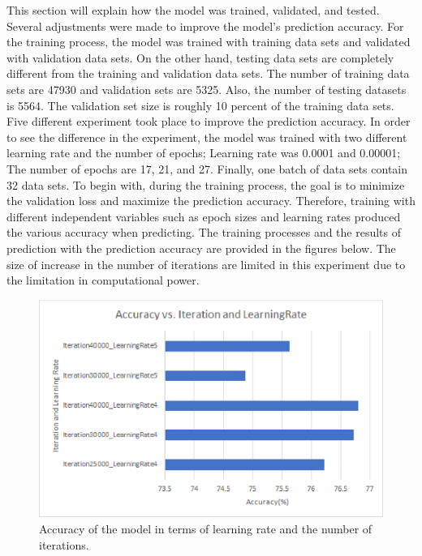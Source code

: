 This section will explain how the model was trained, validated, and tested. Several adjustments were
made to improve the model's prediction accuracy. For the training process, the model was trained with
training data sets and validated with validation data sets. On the other hand, testing data sets are
completely different from the training and validation data sets.
The number of training data sets are 47930 and validation sets are 5325. Also, the number of testing
datasets is 5564. The validation set size is
roughly 10 percent of the training data sets. Five different experiment took place to improve the
prediction accuracy. In order to see the difference in the experiment, the model was trained with two
different learning rate and the number of epochs; Learning rate was 0.0001 and 0.00001; The number of
epochs are 17, 21, and 27. Finally, one batch of data sets contain 32 data sets.
\newline
\newline
\indent
To begin with, during the training process, the goal is to minimize the validation loss and maximize the prediction accuracy. Therefore,
training with different independent variables such as epoch sizes and learning rates produced the various
accuracy when predicting. The training processes and the results of prediction with the prediction accuracy are
provided in the figures below. The size of increase in the number of iterations are limited in this experiment
due to the limitation in computational power.
\newline

    \begin{figure}
        \includegraphics[width=\textwidth, scale=0.25]{Acc.eps}
        \caption{Accuracy of the model in terms of learning rate and the number of iterations.}
        \label{Figure2}
    \end{figure}


